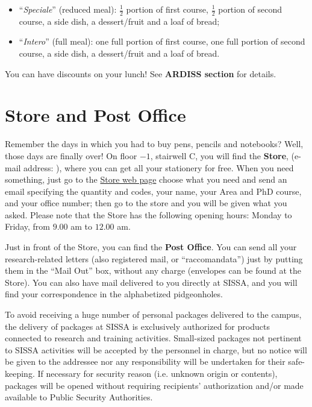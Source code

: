 \documentclass{sissavademecum}
\begin{document}
\begin{itemize}
    \item ``\textit{Speciale}'' (reduced meal): $\frac{1}{2}$ portion of first course, $\frac{1}{2}$ portion of second course, a side dish, a
    dessert/fruit and a loaf of bread;
    \item ``\textit{Intero}'' (full meal): one full portion of first course, one full portion of second course, a side
    dish, a dessert/fruit and a loaf of bread.
\end{itemize}


\noindent You can have discounts on your lunch! See \textbf{ARDISS section} for details.


\section{Store and Post Office}

Remember the days in which you had to buy pens, pencils and notebooks? Well, those days are finally over! On floor $-1$, stairwell C, you will find the \textbf{Store}, (e-mail address: ), where you can get all your stationery for free. When you need something, just go to the \href{http://services.sissa.it/store/}{Store web page} 
choose what you need and send an email specifying the quantity and codes, your name, your Area and PhD course, and your office number; then go to the store and you will be given what you asked. Please note that the Store has the following opening hours: Monday to Friday, from $9.00$ am to $12.00$ am.

Just in front of the Store, you can find the \textbf{Post Office}. You can send all your research-related letters (also registered mail, or ``raccomandata'') just by putting them in the ``Mail Out'' box, without any charge (envelopes can be found at the Store). You can also have mail delivered to you directly at SISSA, and you will find your correspondence in the alphabetized pidgeonholes.

To avoid receiving a huge number of personal packages delivered to the campus, the delivery of packages at SISSA is exclusively authorized for products connected to research and training activities. Small-sized packages not pertinent to SISSA activities will be accepted by the personnel in charge, but no notice will be given to the addressee nor any responsibility will be undertaken for their safe-keeping. If necessary for security reason (i.e. unknown origin or contents), packages will be opened without requiring recipients' authorization and/or made available to Public Security Authorities.
\end{document}
